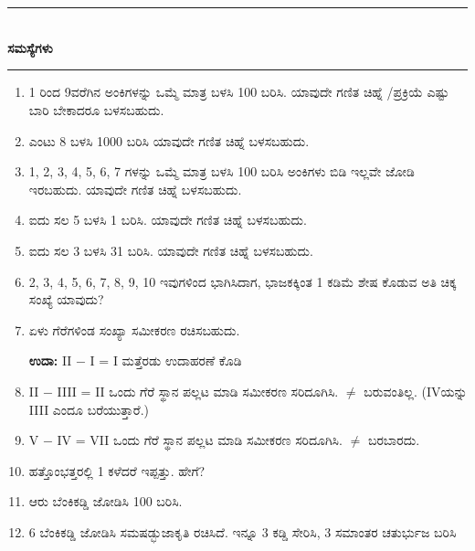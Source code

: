 \chapter{}\label{chap3}

\begin{center}
\rule{5cm}{1pt}\\[5pt]
{\Large\bfseries ಸಮಸ್ಯೆಗಳು}\\[3pt]
\rule{5cm}{1pt}
\end{center}

\smallskip
\begin{enumerate}
\renewcommand{\labelenumi}{\bf\theenumi.}
\itemsep=5pt
\item 1 ರಿಂದ 9ವರೆಗಿನ ಅಂಕಿಗಳನ್ನು ಒಮ್ಮೆ ಮಾತ್ರ ಬಳಸಿ 100 ಬರಿಸಿ. ಯಾವುದೇ ಗಣಿತ ಚಿಹ್ನೆ /ಪ್ರಕ್ರಿಯೆ ಎಷ್ಟು ಬಾರಿ ಬೇಕಾದರೂ ಬಳಸಬಹುದು.

\item ಎಂಟು 8 ಬಳಸಿ 1000 ಬರಿಸಿ ಯಾವುದೇ ಗಣಿತ ಚಿಹ್ನೆ ಬಳಸಬಹುದು.

\item 1, 2, 3, 4, 5, 6, 7 ಗಳನ್ನು ಒಮ್ಮೆ ಮಾತ್ರ ಬಳಸಿ 100 ಬರಿಸಿ ಅಂಕಿಗಳು ಬಿಡಿ ಇಲ್ಲವೇ ಜೋಡಿ ಇರಬಹುದು. ಯಾವುದೇ ಗಣಿತ ಚಿಹ್ನೆ ಬಳಸಬಹುದು.

\item ಐದು ಸಲ 5 ಬಳಸಿ 1  ಬರಿಸಿ. ಯಾವುದೇ ಗಣಿತ ಚಿಹ್ನೆ ಬಳಸಬಹುದು.

\item ಐದು ಸಲ 3 ಬಳಸಿ 31 ಬರಿಸಿ. ಯಾವುದೇ ಗಣಿತ ಚಿಹ್ನೆ  ಬಳಸಬಹುದು. 

\item 2, 3, 4, 5, 6, 7, 8, 9, 10 ಇವುಗಳಿಂದ ಭಾಗಿಸಿದಾಗ, ಭಾಜಕಕ್ಕಿಂತ 1 ಕಡಿಮೆ ಶೇಷ ಕೊಡುವ ಅತಿ ಚಿಕ್ಕ ಸಂಖ್ಯೆ ಯಾವುದು? 

\item ಏಳು ಗೆರೆಗಳಿಂಡ ಸಂಖ್ಯಾ ಸಮೀಕರಣ ರಚಿಸಬಹುದು. 

{\bf ಉದಾ:} II $-$ I = I ಮತ್ತೆರಡು ಉದಾಹರಣೆ ಕೊಡಿ

\item II $-$ IIII = II ಒಂದು ಗೆರೆ ಸ್ಥಾನ ಪಲ್ಲಟ ಮಾಡಿ ಸಮೀಕರಣ ಸರಿದೂಗಿಸಿ. $\neq$ ಬರುವಂತಿಲ್ಲ. (IVಯನ್ನು IIII ಎಂದೂ ಬರೆಯುತ್ತಾರೆ.) 

\item V $-$ IV = VII ಒಂದು ಗೆರೆ ಸ್ಥಾನ ಪಲ್ಲಟ ಮಾಡಿ ಸಮೀಕರಣ ಸರಿದೂಗಿಸಿ. $\neq$ ಬರಬಾರದು.

\item ಹತ್ತೊಂಭತ್ತರಲ್ಲಿ 1 ಕಳೆದರೆ ಇಪ್ಪತ್ತು. ಹೇಗೆ?

\item ಆರು ಬೆಂಕಿಕಡ್ಡಿ ಜೋಡಿಸಿ 100 ಬರಿಸಿ.

\item 6 ಬೆಂಕಿಕಡ್ಡಿ ಜೋಡಿಸಿ ಸಮಷಡ್ಭುಜಾಕೃತಿ ರಚಿಸಿದೆ. ಇನ್ನೂ 3 ಕಡ್ಡಿ  ಸೇರಿಸಿ, 3 ಸಮಾಂತರ ಚತುರ್ಭುಜ ಬರಿಸಿ 


\end{enumerate}
